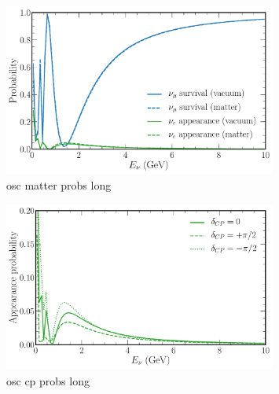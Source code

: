 \begin{figure} %
    \includegraphics[origin=c,width=0.8\textwidth]
    {diagrams/3-theory/explore_osc_vac_vs_matter_probs.pdf}
    \caption[osc matter probs short]
    {osc matter probs long}
    \label{fig:osc_matter_probs}
\end{figure} %

\begin{figure} %
    \includegraphics[origin=c,width=0.8\textwidth]{diagrams/3-theory/explore_osc_cp_probs.pdf}
    \caption[osc cp probs short]
    {osc cp probs long}
    \label{fig:osc_cp_probs}
\end{figure} %

